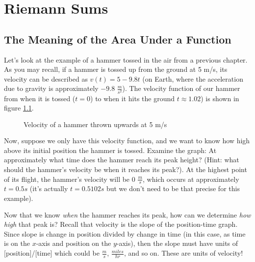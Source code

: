 \chapter{Riemann Sums}

\section{The Meaning of the Area Under a Function}

Let's look at the example of a hammer tossed in the air from a previous chapter. As you may recall, if a hammer is tossed up from the ground at 5 m/s, its velocity can be described as $v(t) = 5-9.8t$ (on Earth, where the acceleration due to gravity is approximately $-9.8$ $\frac{m}{s^2}$). The velocity function of our hammer from when it is tossed ($t=0$) to when it hits the ground $t\approx1.02$) is shown in figure \ref{fig:hammer}.

\begin{figure}[htbp]
	\centering
	\caption{Velocity of a hammer thrown upwards at 5 m/s}
	\label{fig:hammer}
\end{figure}

Now, suppose we only have this velocity function, and we want to know how high above its initial position the hammer is tossed. Examine the graph: At approximately what time does the hammer reach its peak height? (Hint: what should the hammer's velocity be when it reaches its peak?). At the highest point of its flight, the hammer's velocity will be $0$ $\frac{m}{s}$, which occurs at approximately $t=0.5s$ (it's actually $t=0.5102s$ but we don't need to be that precise for this example). 

Now that we know \textit{when} the hammer reaches its peak, how can we determine \textit{how high} that peak is? Recall that velocity is the slope of the position-time graph. Since slope is change in position divided by change in time (in this case, as time is on the $x$-axis and position on the $y$-axis), then the slope must have units of [position]/[time] which could be $\frac{m}{s}$, $\frac{miles}{hr}$, and so on. These are units of velocity! 

